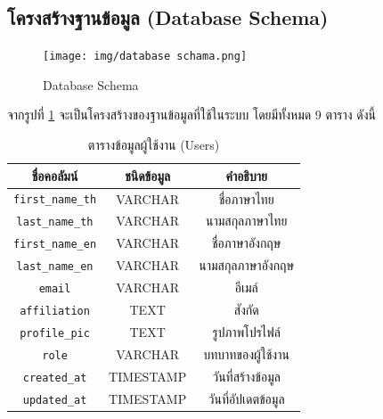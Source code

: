 \newpage
\subsection{โครงสร้างฐานข้อมูล (Database Schema)}
\begin{figure}[hb]
    \begin{center}
        \texttt{[image: img/database schama.png]}
    \end{center}
    \caption[Poem]{Database Schema}
    \label{fig:data_schema}
\end{figure}
จากรูปที่ \ref{fig:data_schema} จะเป็นโครงสร้างของฐานข้อมูลที่ใช้ในระบบ โดยมีทั้งหมด 9  ตาราง ดังนี้


\begin{table}[hb]
    \centering
    \begin{tabular}{|c|c|c|}
        \hline
        ชื่อคอลัมน์               & ชนิดข้อมูล   & คำอธิบาย          \\ \hline
        \verb |first_name_th| & VARCHAR   & ชื่อภาษาไทย       \\ \hline
        \verb |last_name_th|  & VARCHAR   & นามสกุลภาษาไทย   \\ \hline
        \verb |first_name_en| & VARCHAR   & ชื่อภาษาอังกฤษ     \\ \hline
        \verb |last_name_en|  & VARCHAR   & นามสกุลภาษาอังกฤษ \\ \hline
        \verb |email|         & VARCHAR   & อีเมล์            \\ \hline
        \verb |affiliation|   & TEXT      & สังกัด            \\ \hline
        \verb |profile_pic|   & TEXT      & รูปภาพโปรไฟล์     \\ \hline
        \verb |role|          & VARCHAR   & บทบาทของผู้ใช้งาน  \\ \hline
        \verb |created_at|    & TIMESTAMP & วันที่สร้างข้อมูล     \\ \hline
        \verb |updated_at|    & TIMESTAMP & วันที่อัปเดตข้อมูล    \\ \hline
    \end{tabular}
    \caption{ตารางข้อมูลผู้ใช้งาน (Users)}
    \label{tab:user_data}
\end{table}

